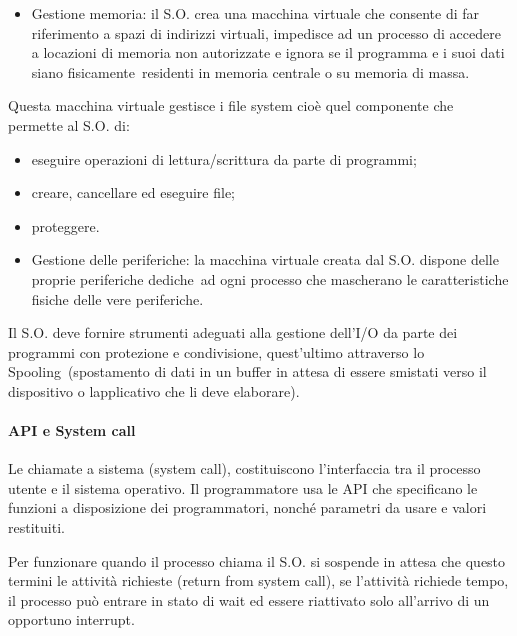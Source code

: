 \documentclass[
]{article}
\providecommand{\tightlist}{%
  \setlength{\itemsep}{0pt}\setlength{\parskip}{0pt}}
\begin{document}
{}

\begin{itemize}
\tightlist
\item
  {Gestione memoria}{: il S.O. crea una macchina virtuale che consente
  di far riferimento a spazi di indirizzi virtuali, impedisce ad un
  processo di accedere a locazioni di memoria non autorizzate e ignora
  se il programma e i suoi dati siano }{fisicamente}{~residenti in
  memoria centrale o su memoria di massa.}
\end{itemize}

{Questa macchina virtuale gestisce i }{file system }{cioè quel
componente che permette al S.O. di:}

\begin{itemize}
\tightlist
\item
  {eseguire operazioni di lettura/scrittura da parte di programmi;}
\item
  {creare, cancellare ed eseguire file;}
\item
  {proteggere.}
\end{itemize}

{}

\begin{itemize}
\tightlist
\item
  {Gestione delle periferiche}{: la macchina virtuale creata dal S.O.
  dispone delle proprie periferiche }{dediche}{~ad ogni processo che
  mascherano le caratteristiche fisiche delle vere periferiche.}
\end{itemize}

{Il S.O. deve fornire strumenti adeguati alla gestione dell'I/O da parte
dei programmi con protezione e condivisione, quest'ultimo attraverso lo
}{Spooling}{~(spostamento di dati in un buffer in attesa di essere
smistati verso il dispositivo o l\textquotesingle applicativo che li
deve elaborare).}

{}

\paragraph{\texorpdfstring{{API e System
call}}{API e System call}}\label{h.a2bq0ju8xrt6}

{Le chiamate a sistema (system call), costituiscono l'interfaccia tra il
processo utente e il sistema operativo. Il programmatore usa le API che
specificano le funzioni a disposizione dei programmatori, nonché
parametri da usare e valori restituiti.}

{Per funzionare quando il processo chiama il S.O. si sospende in attesa
che questo termini le attività richieste (}{return from system call}{),
se l'attività richiede tempo, il processo può entrare in stato di wait
ed essere riattivato solo all'arrivo di un opportuno interrupt.}
\end{document}
